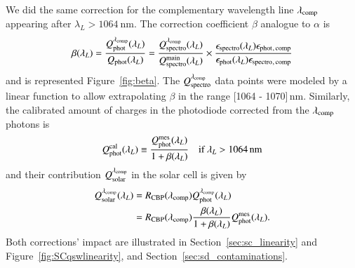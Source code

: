 We did the same correction for the complementary wavelength line $\lambda_{\rm comp}$ appearing after $\lambda_L > \SI{1064}{\nm}$. The correction coefficient $\beta$ analogue to $\alpha$ is
\begin{equation}
    \beta(\lambda_L) = \frac{Q_{\mathrm{phot}}^{\lambda_{\rm comp}}(\lambda_L)}{Q_{\mathrm{phot}}(\lambda_L)} = \frac{Q_{\mathrm{spectro}}^{\lambda_{\rm comp}}(\lambda_L)}{Q_{\mathrm{spectro}}^{\mathrm{main}}(\lambda_L)} \times \frac{\epsilon_{\mathrm{spectro}}(\lambda_L)\epsilon_{\mathrm{phot}}{}_{\mathrm{, \, comp}}}{\epsilon_{\mathrm{phot}}(\lambda_L)\epsilon_{\mathrm{spectro}}{}_{\mathrm{, \, comp}}} 
    \label{eq:beta}
\end{equation}
and is represented Figure~\ref{fig:beta}. The $Q_{\mathrm{spectro}}^{\lambda_{\rm comp}}$ data points were modeled by a linear function to allow extrapolating $\beta$ in the range [1064 - 1070]\,nm. Similarly, the calibrated amount of charges in the photodiode corrected from the $\lambda_{\rm comp}$ photons is
\begin{equation}
        Q_{\mathrm{phot}}^{\mathrm{cal}}(\lambda_L) \equiv  \frac{Q_{\mathrm{phot}}^{\mathrm{mes}}(\lambda_L)}{1 + \beta(\lambda_L)} \quad\text{if}\ \lambda_L > \SI{1064}{\nano\meter}
        \label{eq:qphot_cal1064}
\end{equation}
and their contribution $Q_{\mathrm{solar}}^{\lambda_{\rm comp}}$ in the solar cell is given by
\begin{equation}
\begin{aligned}
    Q_{\mathrm{solar}}^{\lambda_{\rm comp}}(\lambda_L) & = R_{\mathrm{CBP}}(\lambda_{\rm comp})  Q_{\mathrm{phot}}^{\lambda_{\rm comp}}(\lambda_L) \\ 
    & = R_{\mathrm{CBP}}(\lambda_{\rm comp}) \frac{ \beta(\lambda_L) }{1+ \beta(\lambda_L)} Q_{\mathrm{phot}}^{\mathrm{mes}}(\lambda_L).
    \label{eq:qsolar_cal1064}
\end{aligned}
\end{equation}
Both corrections' impact are illustrated in Section~\ref{sec:sc_linearity} and Figure~\ref{fig:SCqswlinearity}, and Section~\ref{sec:sd_contaminations}.


